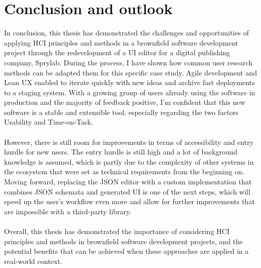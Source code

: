 %
\chapter{Conclusion and outlook}
\label{chap:conclusion}      
In conclusion, this thesis has demonstrated the challenges and opportunities of applying HCI principles and methods in a brownfield software development project through the redevelopment of a UI editor for a digital publishing company, Sprylab.
During the process, I have shown how common user research methods can be adapted them for this specific case study.
Agile development and Lean UX enabled to iterate quickly with new ideas and archive fast deployments to a staging system.
With a growing group of users already using the software in production and the majority of feedback positive, I'm confident that this new software is a stable and extensible tool, especially regarding the two factors Usability and Time-on-Task.
\\\\
However, there is still room for improvements in terms of accessibility and entry hurdle for new users.
The entry hurdle is still high and a lot of background knowledge is assumed, which is partly due to the complexity of other systems in the ecosystem that were set as technical requirements from the beginning on.
Moving forward, replacing the JSON editor with a custom implementation that combines JSON schemata and generated UI is one of the next steps, which will speed up the user's
workflow even more and allow for further improvements that are impossible with a third-party library.
\\\\
Overall, this thesis has demonstrated the importance of considering HCI principles and methods in brownfield software development projects, and the potential benefits that can be achieved when these approaches are applied in a real-world context.